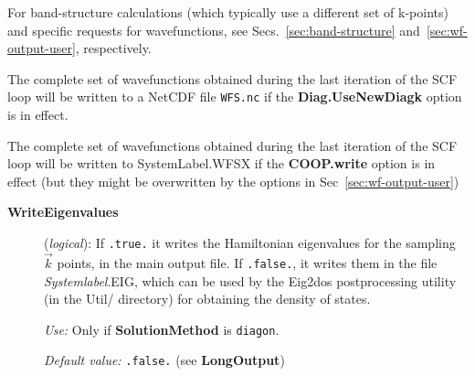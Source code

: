 \documentclass[11pt]{article}
\begin{document}
For band-structure calculations (which typically use a different set
of k-points) and specific requests for wavefunctions, see
Secs.~\ref{sec:band-structure} and~\ref{sec:wf-output-user}, respectively.

The complete set of wavefunctions obtained during the last
iteration of the SCF loop will be written to a NetCDF file
{\tt WFS.nc} if the {\bf Diag.UseNewDiagk} option is in effect.

The complete set of wavefunctions obtained during the last
iteration of the SCF loop will be written to SystemLabel.WFSX 
if the {\bf COOP.write} option is in effect (but they might be
overwritten by the options in Sec~\ref{sec:wf-output-user})

\begin{description}
\item[{\bf WriteEigenvalues}] ({\it logical}):
If {\tt .true.} it writes the Hamiltonian eigenvalues for the sampling
$\vec k$ points, in the main output file.
If {\tt .false.}, it writes them in the file {\it Systemlabel}.EIG,
which can be used by the {\sc Eig2dos} postprocessing 
utility (in the Util/ directory) for obtaining the density of
states.

{\it Use:} Only if {\bf SolutionMethod} is {\tt diagon}.
 
{\it Default value:} {\tt .false.} (see {\bf LongOutput})

\end{description}
\end{document}
